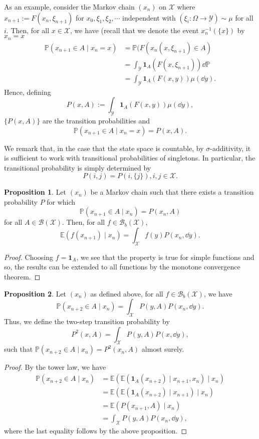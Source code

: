 \documentclass[]{article}
\theoremstyle{definition}
\theoremstyle{definition}
\newtheorem{proposition}{Proposition}[section]
\begin{document}
As an example, consider the Markov chain \((x_n)\) on \(\mathcal{X}\) where 
\(x_{n + 1} := F(x_n, \xi_{n + 1})\) for \(x_0, \xi_1, \xi_2, \cdots\)
independent with \((\xi_i : \Omega \to \mathcal{Y}) \sim \mu\) for all \(i\). 
Then, for all \(x \in \mathcal{X}\), we have (recall that we denote the event 
\(x_n^{-1}(\{x\})\) by \(x_n = x\)
\[\begin{split}
  \mathbb{P}(x_{n + 1} \in A \mid x_n = x) & = \mathbb{P}(F(x_n(x, \xi_{n + 1}) \in A)\\
  & = \int_{\mathcal{Y}} \mathbf{1}_A(F(x, \xi_{n + 1})) \dd \mathbb{P}\\
  & = \int_{\mathcal{Y}} \mathbf{1}_A(F(x, y)) \mu(\dd y).
\end{split}\]
Hence, defining 
\[P(x, A) := \int_{\mathcal{Y}} \mathbf{1}_A(F(x, y)) \mu(\dd y),\]
\(\{P(x, A)\}\) are the transition probabilities and 
\[\mathbb{P}(x_{n + 1} \in A \mid x_n = x) = P(x, A).\]

We remark that, in the case that the state space is countable, by \(\sigma\)-additivity,
it is sufficient to work with transitional probabilities of singletons. In particular, 
the transitional probability is simply determined by 
\[P(i, j) = P(i, \{j\}), i, j \in \mathcal{X}.\]

\begin{proposition}
  Let \((x_n)\) be a Markov chain such that there exists a transition 
  probability \(P\) for which 
  \[\mathbb{P}(x_{n + 1} \in A \mid x_n) = P(x_n, A)\]
  for all \(A \in \mathcal{B}(\mathcal{X})\). Then, for all \(f \in \mathcal{B}_b(\mathcal{X})\),
  \[\mathbb{E}(f(x_{n + 1}) \mid x_n) = \int_{\mathcal{X}} f(y) P(x_n, \dd y).\]
\end{proposition}
\begin{proof}
  Choosing \(f = \mathbf{1}_A\), we see that the property is true for simple functions 
  and so, the results can be extended to all functions by the monotone convergence theorem.
\end{proof}

\begin{proposition}
  Let \((x_n)\) as defined above, for all \(f \in \mathcal{B}_b(\mathcal{X})\), 
  we have 
  \[\mathbb{P}(x_{n + 2} \in A \mid x_n) = \int_{\mathcal{X}}P(y, A)P(x_n, \dd y).\]
  Thus, we define the two-step transition probability by 
  \[P^2(x, A) = \int_{\mathcal{X}} P(y, A) P(x, \dd y),\]
  such that \(\mathbb{P}(x_{n + 2} \in A \mid x_n) = P^2(x_n, A)\) almost surely.
\end{proposition}
\begin{proof}
  By the tower law, we have 
  \[\begin{split}
    \mathbb{P}(x_{n + 2} \in A \mid x_n) & = \mathbb{E}(\mathbb{E}(\mathbf{1}_A(x_{n + 2}) \mid x_{n + 1}, x_n) \mid x_n)\\
    & = \mathbb{E}(\mathbb{E}(\mathbf{1}_A(x_{n + 2}) \mid x_{n + 1}) \mid x_n)\\
    & = \mathbb{E}(P(x_{n + 1}, A) \mid x_n)\\
    & = \int_{\mathcal{X}}P(y, A)P(x_n, \dd y),
  \end{split}\]
  where the last equality follows by the above proposition.
\end{proof}
\end{document}
